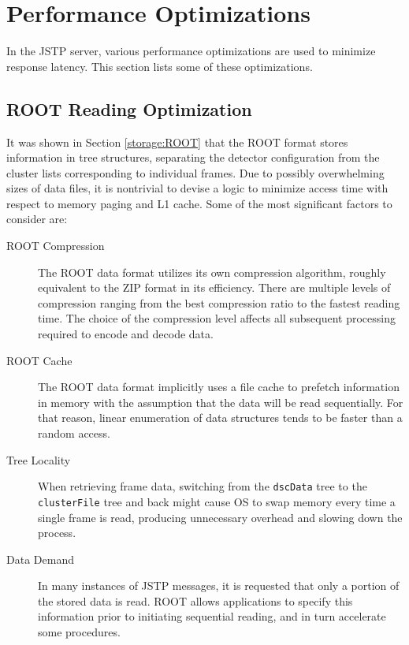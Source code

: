 \section{Performance Optimizations}
In the JSTP server, various performance optimizations are used to minimize response latency. This section lists some of these optimizations.

\subsection{ROOT Reading Optimization}
It was shown in Section \ref{storage:ROOT} that the ROOT format stores information in tree structures, separating the detector configuration from the cluster lists corresponding to individual frames. Due to possibly overwhelming sizes of data files, it is nontrivial to devise a logic to minimize access time with respect to memory paging and L1 cache. Some of the most significant factors to consider are:

\begin{description}
	\item[ROOT Compression]
	The ROOT data format utilizes its own compression algorithm, roughly equivalent to the ZIP format in its efficiency. There are multiple levels of compression ranging from the best compression ratio to the fastest reading time. The choice of the compression level affects all subsequent processing required to encode and decode data.

	\item[ROOT Cache]
	The ROOT data format implicitly uses a file cache to prefetch information in memory with the assumption that the data will be read sequentially. For that reason, linear enumeration of data structures tends to be faster than a random access.

	\item[Tree Locality]
	When retrieving frame data, switching from the \texttt{dscData} tree to the \texttt{clusterFile} tree and back might cause OS to swap memory every time a single frame is read, producing unnecessary overhead and slowing down the process.

	\item[Data Demand]
	In many instances of JSTP messages, it is requested that only a portion of the stored data is read. ROOT allows applications to specify this information prior to initiating sequential reading, and in turn accelerate some procedures.
\end{description}

